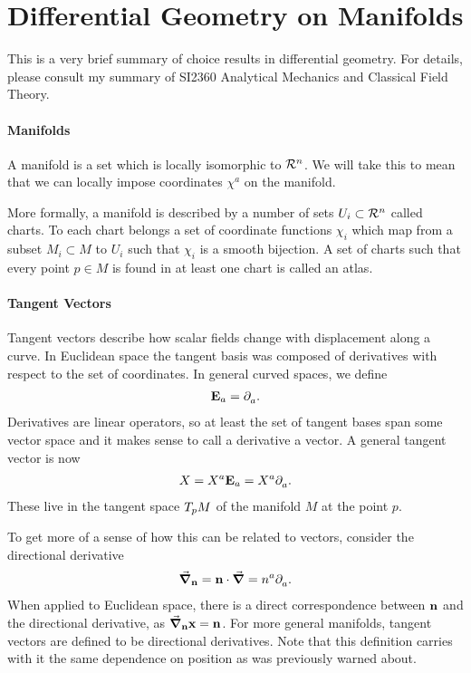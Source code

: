\section{Differential Geometry on Manifolds}
This is a very brief summary of choice results in differential geometry. For details, please consult my summary of SI2360 Analytical Mechanics and Classical Field Theory.

\paragraph{Manifolds}
A manifold is a set which is locally isomorphic to $\mathcal{R}^{n}$. We will take this to mean that we can locally impose coordinates $\chi^{a}$ on the manifold.

More formally, a manifold is described by a number of sets $U_{i}\subset\mathcal{R}^{n}$ called charts. To each chart belongs a set of coordinate functions $\chi_{i}$ which map from a subset $M_{i}\subset M$ to $U_{i}$ such that $\chi_{i}$ is a smooth bijection. A set of charts such that every point $p\in M$ is found in at least one chart is called an atlas.

\paragraph{Tangent Vectors}
Tangent vectors describe how scalar fields change with displacement along a curve. In Euclidean space the tangent basis was composed of derivatives with respect to the set of coordinates. In general curved spaces, we define
\begin{align*}
	\vb{E}_{a} = \partial^{}_{a}.
\end{align*}
Derivatives are linear operators, so at least the set of tangent bases span some vector space and it makes sense to call a derivative a vector. A general tangent vector is now
\begin{align*}
	X = X^{a}\vb{E}_{a} = X^{a}\partial^{}_{a}.
\end{align*}
These live in the tangent space $T_{p}M$ of the manifold $M$ at the point $p$.

To get more of a sense of how this can be related to vectors, consider the directional derivative
\begin{align*}
	\grad_{\vb{n}} = \vb{n}\cdot\grad = n^{a}\partial^{}_{a}.
\end{align*}
When applied to Euclidean space, there is a direct correspondence between $\vb{n}$ and the directional derivative, as $\grad_{\vb{n}}{\vb{x}} = \vb{n}$. For more general manifolds, tangent vectors are defined to be directional derivatives. Note that this definition carries with it the same dependence on position as was previously warned about.

